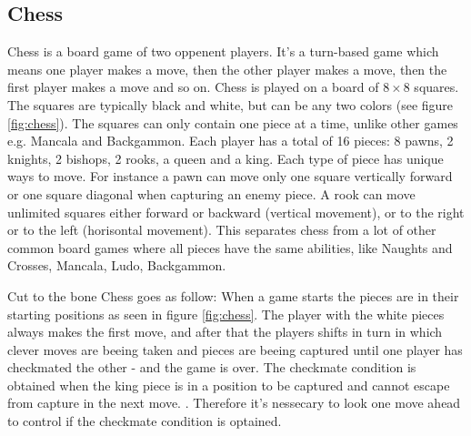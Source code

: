 \subsection{Chess}
Chess is a board game of two oppenent players. It's a turn-based game which means one player makes a move, 
then the other player makes a move, then the first player makes a move and so on. Chess is played on a board of $8 \times 8$ squares. The squares are typically black and white, but can be any two colors (see figure \ref{fig:chess}). The squares can only contain one piece at a time, unlike other games e.g. Mancala and Backgammon. Each player has a total of 16 pieces: 8 pawns, 2 knights, 2 bishops, 2 rooks, a queen and a king. Each type of piece has unique ways to move. For instance a pawn can move only one square vertically forward or one square diagonal when capturing an enemy piece. A rook can move unlimited squares either forward or backward (vertical movement), or to the right or to the left (horisontal movement). This separates chess from a lot of other common board games where all pieces have the same abilities, like Naughts and Crosses, Mancala, Ludo, Backgammon.  

Cut to the bone Chess goes as follow: When a game starts the pieces are in their starting positions as seen in figure \ref{fig:chess}. The player with the white pieces always makes the first move, and after that the players shifts in turn in which clever moves are beeing taken and pieces are beeing captured until one player has checkmated the other - and the game is over. The checkmate condition is obtained when the king piece is in a position to be captured and cannot escape from capture in the next move. \cite{chessrules}. Therefore it's nessecary to look one move ahead to control if the checkmate condition is optained.

